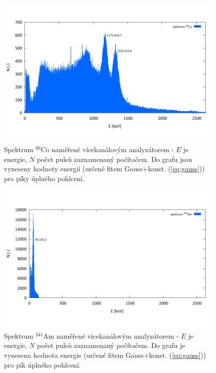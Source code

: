 \documentclass[english]{article}
\begin{document}
	\begin{figure}[h!]
	\begin{center}
	    \vspace*{-1cm}
		\includegraphics[width=\linewidth]{../gnuplot/solo/Co.pdf}
	    \vspace*{-2cm}
		\caption{Spektrum $^{60}$Co naměřené vícekanálovým analyzátorem - $E$ je energie, $N$ počet pulsů zaznamenaný počítačem. Do grafu jsou vyneseny hodnoty energií (určené fitem Gauss+konst. (\ref{eq:gauss})) pro píky úplného pohlcení.}
		\label{fig:g_Co_vice}
	\end{center}
	\end{figure}	
	
	\begin{figure}[h!]
	\begin{center}
	    \vspace*{-1cm}
		\includegraphics[width=\linewidth]{../gnuplot/solo/Am.pdf}
	    \vspace*{-2cm}
		\caption{Spektrum $^{241}$Am naměřené vícekanálovým analyzátorem - $E$ je energie, $N$ počet pulsů zaznamenaný počítačem. Do grafu je vynesena hodnota energie (určené fitem Gauss+konst. (\ref{eq:gauss})) pro pík úplného pohlcení.}
		\label{fig:g_Am_vice}
	\end{center}
	\end{figure}	
	
\end{document}
